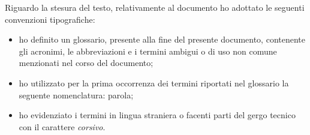 Riguardo la stesura del testo, relativamente al documento ho adottato le seguenti convenzioni tipografiche:
\begin{itemize}
	\item ho definito un glossario, presente alla fine del presente documento, contenente gli acronimi, le abbreviazioni e i termini ambigui o di uso non comune menzionati nel corso del documento;
	\item ho utilizzato per la prima occorrenza dei termini riportati nel glossario la seguente nomenclatura: parola\glsfirstoccur;
	\item ho evidenziato i termini in lingua straniera o facenti parti del gergo tecnico con il carattere \emph{corsivo}.
\end{itemize}
